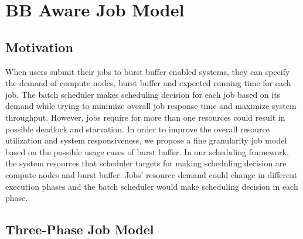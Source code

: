 \section{BB Aware Job Model}
\label{Sec:Model}


\subsection{Motivation}
When users submit their jobs to burst buffer enabled systems, they can specify the 
demand of compute nodes, burst buffer and expected running time for each job.
The batch scheduler makes scheduling decision for each job based on its demand while trying to 
minimize overall job response time and maximize system throughput. 
However, jobs require for more than one resources could result in possible deadlock and starvation.
In order to improve the overall resource utilization and system responsiveness, we propose
a fine granularity job model based on the possible usage cases of burst buffer.  
In our scheduling framework, 
the system resources that scheduler targets for making scheduling decision are
compute nodes and burst buffer.
Jobs' resource demand could change in different execution phases and the batch scheduler 
would make scheduling decision in each phase.


\subsection{Three-Phase Job Model}


